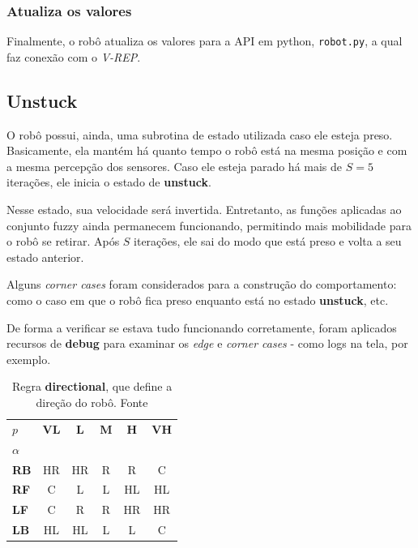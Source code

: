 \documentclass[twoside,conference,a4paper]{IEEEtran}
\begin{document}
  \subsubsection{Atualiza os valores}
    Finalmente, o robô atualiza os valores para a API em python, \texttt{robot.py}, a qual faz conexão com o \textit{V-REP}.

\subsection{Unstuck}
    O robô possui, ainda, uma subrotina de estado utilizada caso ele esteja preso. Basicamente, ela mantém há quanto tempo o robô está na mesma posição e com a mesma percepção dos sensores. Caso ele esteja parado há mais de $S = 5$ iterações, ele inicia o estado de \textbf{unstuck}.

    Nesse estado, sua velocidade será invertida. Entretanto, as funções aplicadas ao conjunto fuzzy ainda permanecem funcionando, permitindo mais mobilidade para o robô se retirar. Após $S$ iterações, ele sai do modo que está preso e volta a seu estado anterior.

    Alguns \textit{corner cases} foram considerados para a construção do comportamento: como o caso em que o robô fica preso enquanto está no estado \textbf{unstuck}, etc. 

    De forma a verificar se estava tudo funcionando corretamente, foram aplicados recursos de \textbf{debug} para examinar os \textit{edge} e \textit{corner cases} - como logs na tela, por exemplo.


\begin{table}[ht]
  \renewcommand{\arraystretch}{1.3}
  \centering
   \caption{Regra \textbf{directional}, que define a direção do robô. Fonte \cite{Reinhard:1995}}
   \label{tab:tab1}
   \begin{tabular}{lccccc}\hline
      $p$       & \textbf{VL} & \textbf{L}  & \textbf{M}  & \textbf{H}  & \textbf{VH} \\
      $\alpha$  &    &    &    &    &    \\ \hline
       \textbf{RB}  & HR & HR & R  & R  & C  \\ \hline
       \textbf{RF}  & C  & L  & L  & HL & HL \\ \hline
       \textbf{LF}  & C  & R  & R  & HR & HR \\ \hline
       \textbf{LB}  & HL & HL & L  & L  & C  \\ \hline
   \end{tabular}
\end{table}
\end{document}
